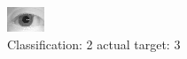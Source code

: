 \begin{figure}[h!]
\begin{center}
\includegraphics[width=0.60\columnwidth]{figures/ID1130_class_2_target_3.png}
\end{center}
\caption{ Classification: 2 actual target: 3}
\label{fig:ID1130_class_2_target_3}
\end{figure}

